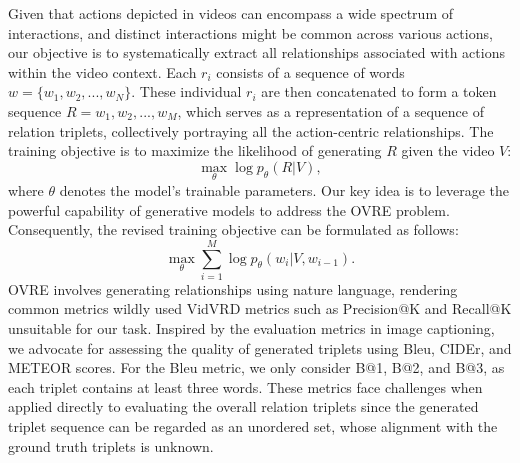 \documentclass[letterpaper]{article}
\begin{document}

Given that actions depicted in videos can encompass a wide spectrum of interactions, and distinct interactions might be common across various actions, our objective is to systematically extract all relationships associated with actions within the video context.
Each $r_{i}$ consists of a sequence of words $w=\{w_{1},w_{2},...,w_{N}\}$. These individual $r_{i}$ are then concatenated to form a token sequence $R=w_{1},w_{2},...,w_{M}$, which serves as a representation of a sequence of relation triplets, collectively portraying all the action-centric relationships.
The training objective is to maximize the likelihood of generating $R$ given the video $V$:
$$
\underset{\theta}{\max} \log p_{\theta}(R|V),
$$
where $\theta$ denotes the model's trainable parameters.
Our key idea is to leverage the powerful capability of generative models to address the OVRE problem.
Consequently, the revised training objective can be formulated as follows:
$$
\underset{\theta}{\max}\sum_{i=1}^{M}\log p_{\theta}(w_{i}|V,w_{i-1}).
$$
OVRE involves generating relationships using nature language, rendering common metrics wildly used VidVRD metrics such as Precision@K and Recall@K unsuitable for our task.
Inspired by the evaluation metrics in image captioning, we advocate for assessing the quality of generated triplets using Bleu, CIDEr, and METEOR scores.
For the Bleu metric, we only consider B@1, B@2, and B@3, as each triplet contains at least three words.
These metrics face challenges when applied directly to evaluating the overall relation triplets since the generated triplet sequence can be regarded as an unordered set, whose alignment with the ground truth triplets is unknown.
\end{document}
